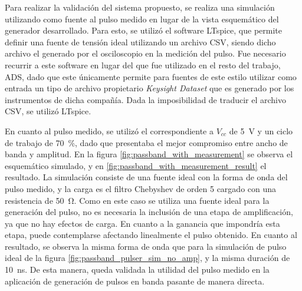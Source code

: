 Para realizar la validación del sistema propuesto, se realiza una simulación
utilizando como fuente al pulso medido en lugar de la vista esquemático del
generador desarrollado. Para esto, se utilizó el software LTspice, que permite
definir una fuente de tensión ideal utilizando un archivo CSV, siendo dicho
archivo el generado por el osciloscopio en la medición del pulso. Fue necesario
recurrir a este software en lugar del que fue utilizado en el resto del trabajo,
ADS, dado que este únicamente permite para fuentes de este estilo utilizar como
entrada un tipo de archivo propietario \textit{Keysight Dataset} que es generado
por los instrumentos de dicha compañía. Dada la imposibilidad de traducir el
archivo CSV, se utilizó LTspice.

En cuanto al pulso medido, se utilizó el correspondiente a $V_{cc}$ de
\qty{5}{\volt} y un ciclo de trabajo de \qty{70}{\percent}, dado que presentaba
el mejor compromiso entre ancho de banda y amplitud. En la figura
\ref{fig:passband_with_measurement} se observa el esquemático simulado, y en
\ref{fig:passband_with_measurement_result} el resultado. La simulación consiste
de una fuente ideal con la forma de onda del pulso medido, y la carga es el
filtro Chebyshev de orden 5 cargado con una resistencia de \qty{50}{\ohm}. Como
en este caso se utiliza una fuente ideal para la generación del pulso, no es
necesaria la inclusión de una etapa de amplificación, ya que no hay efectos de
carga. En cuanto a la ganancia que impondría esta etapa, puede contemplarse
afectando linealmente el pulso obtenido. En cuanto al resultado, se observa la
misma forma de onda que para la simulación de pulso ideal de la figura
\ref{fig:passband_pulser_sim_no_amp}, y la misma duración de
\qty{10}{\nano\second}. De esta manera, queda validada la utilidad del pulso
medido en la aplicación de generación de pulsos en banda pasante de manera
directa.

